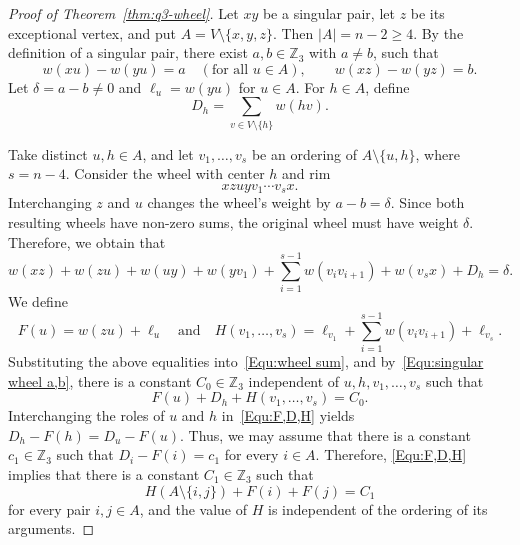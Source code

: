\documentclass[10pt,a4paper]{amsart}
\newcommand{\Z}{\mathbb Z}
\begin{document}
\begin{proof}[Proof of Theorem~\ref{thm:q3-wheel}]
    Let $xy$ be a singular pair, let $z$ be its exceptional vertex, and put $A=V\setminus\{x,y,z\}$.
    Then $|A|=n-2\ge4$.
    By the definition of a singular pair, there exist $a,b\in\Z_3$ with $a\ne b$, such that
    \begin{equation}\label{Equ:singular wheel a,b}
        w(xu)-w(yu)=a\quad(\text{for all }u\in A),
        \qquad
        w(xz)-w(yz)=b.
    \end{equation}
    Let $\delta=a-b\ne0$ and $\ell_u=w(yu)$ for $u\in A$.  For $h\in A$, define
    \[
        D_h=\sum_{v\in V\setminus\{h\}}w(hv).
    \]

    Take distinct $u,h\in A$, and let $v_1,\ldots,v_s$ be an ordering of $A\setminus\{u,h\}$, where $s=n-4$.  Consider the wheel with center $h$ and rim
    \[
        xzuyv_1\cdots v_sx.
    \]
    Interchanging $z$ and $u$ changes the wheel's weight by $a-b=\delta$.
    Since both resulting wheels have non-zero sums, the original wheel must have weight $\delta$.
    Therefore, we obtain that
    \begin{equation}\label{Equ:wheel sum}
        w(xz)+w(zu)+w(uy)+w(yv_1)+\sum_{i=1}^{s-1}w(v_i v_{i+1})+w(v_sx)+D_h=\delta.
    \end{equation}
    We define
    \begin{equation}\label{Equ:define F and H}
        F(u)=w(zu)+\ell_u \quad \text{and}\quad
        H(v_1,\ldots,v_s)=\ell_{v_1}+\sum_{i=1}^{s-1}w(v_i v_{i+1})+\ell_{v_s}.
    \end{equation}
    Substituting the above equalities into~\eqref{Equ:wheel sum}, and by~\eqref{Equ:singular wheel a,b}, there is a constant $C_0\in \Z_3$ independent of $u,h,v_1,\ldots,v_s$ such that
    \begin{equation}\label{Equ:F,D,H}
        F(u)+D_h+H(v_1,\ldots,v_s)=C_0.
    \end{equation}
    Interchanging the roles of $u$ and $h$ in~\eqref{Equ:F,D,H} yields $D_h-F(h)=D_u-F(u)$.
    Thus, we may assume that there is a constant $c_1\in\Z_3$ such that $D_i-F(i)=c_1$ for every $i\in A$.
    Therefore, \eqref{Equ:F,D,H} implies that there is a constant $C_1\in\Z_3$ such that
    \begin{equation}\label{Equ:H+F+F=C}
        H(A\setminus\{i,j\})+F(i)+F(j)=C_1
    \end{equation}
    for every pair $i,j\in A$, and the value of $H$ is independent of the ordering of its arguments.


\end{proof}
\end{document}
